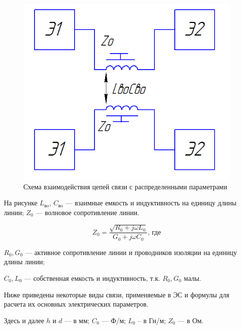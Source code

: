 \documentclass[unicode, 12pt, a4paper, oneside]{article}
\begin{document}
\begin{figure}
\centering
\includegraphics[width=0.7\linewidth]{71_raspred.png}
\caption{Схема взаимодействия цепей связи с распределенными параметрами}
\end{figure}

На рисунке $ L_\text{вo} $, $ C_\text{вo} $ --- взаимные емкость и индуктивность на единицу длины линии; $ Z_0 $ --- волновое сопротивление линии.

\begin{equation}
Z_0 = \dfrac{\sqrt{R_0 + j\omega L_0}}{G_0 + j \omega C_0}\text{, где}
\end{equation}
\par $ R_0, G_0 $ --- активное сопротивление линии и проводников изоляции на единицу длины линии;
\par $ C_0, L_0 $ --- собственная емкость и индуктивность, т.к. $ R_0, G_0 $ малы.

Ниже приведены некоторые виды связи, применяемые в ЭС и формулы для расчета их основных электрических параметров.

Здесь и далее $ h $ и $ d $ --- в мм; $ C_0 $ --- Ф/м;   $ L_0 $ – в Гн/м; $ Z_0 $ --- в Ом.
\end{document}
